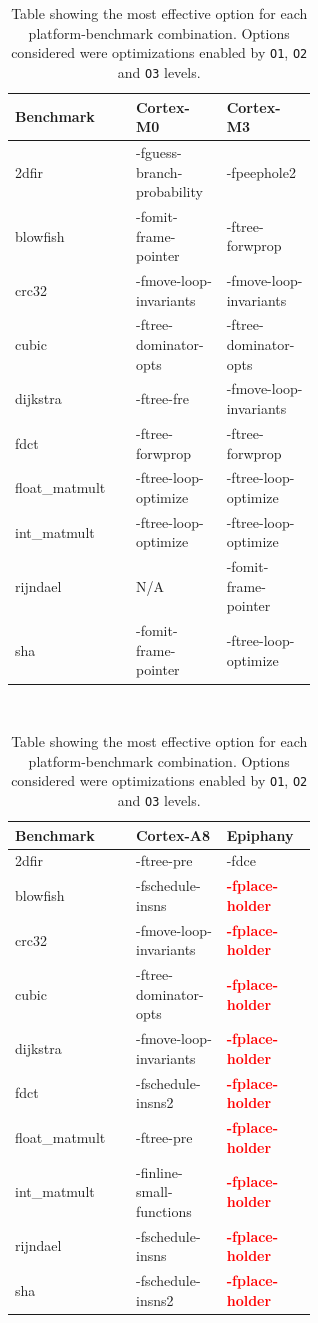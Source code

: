 \documentclass[twocolumn]{article}
\newcommand{\todo}[1]{\textbf{\textcolor{red}{#1}}}
\begin{document}
\begin{table}
	\centering
	\begin{tabular}{l >{\ttfamily} p{0.3\linewidth} >{\ttfamily} p{0.3\linewidth} }
		\bfseries Benchmark&\rmfamily\bfseries Cortex-M0&\rmfamily\bfseries Cortex-M3\\
		\hline
		2dfir			& -fguess-branch-probability & -fpeephole2				 \\
		blowfish		& -fomit-frame-pointer 		 & -ftree-forwprop			 \\
		crc32			& -fmove-loop-invariants 	 & -fmove-loop-invariants 	 \\
		cubic			& -ftree-dominator-opts 	 & -ftree-dominator-opts  	 \\
		dijkstra		& -ftree-fre 				 & -fmove-loop-invariants	 \\
		fdct			& -ftree-forwprop 			 & -ftree-forwprop 			 \\
		float\_matmult	& -ftree-loop-optimize 		 & -ftree-loop-optimize 	 \\
		int\_matmult	& -ftree-loop-optimize 		 & -ftree-loop-optimize 	 \\
		rijndael		& N/A 						 & -fomit-frame-pointer 	 \\
		sha				& -fomit-frame-pointer 		 & -ftree-loop-optimize 	 \\
	\end{tabular} \\[1em]

	\begin{tabular}{l >{\ttfamily} p{0.3\linewidth} >{\ttfamily} p{0.3\linewidth}}
		\bfseries Benchmark& \rmfamily\bfseries Cortex-A8		& \rmfamily\bfseries Epiphany\\
		\hline
		2dfir			& -ftree-pre				& -fdce \\
		blowfish		& -fschedule-insns			& \todo{-fplace-holder} \\
		crc32			& -fmove-loop-invariants	& \todo{-fplace-holder} \\
		cubic			& -ftree-dominator-opts		& \todo{-fplace-holder} \\
		dijkstra		& -fmove-loop-invariants	& \todo{-fplace-holder} \\
		fdct			& -fschedule-insns2			& \todo{-fplace-holder} \\
		float\_matmult	& -ftree-pre				& \todo{-fplace-holder} \\
		int\_matmult	& -finline-small-functions	& \todo{-fplace-holder} \\
		rijndael		& -fschedule-insns			& \todo{-fplace-holder} \\
		sha				& -fschedule-insns2			& \todo{-fplace-holder} \\
	\end{tabular}

	\caption{Table showing the most effective option for each platform-benchmark combination. Options considered were
	optimizations enabled by \texttt{O1}, \texttt{O2} and \texttt{O3} levels.}
	\label{Table:BestFlags}
\end{table}
\end{document}
